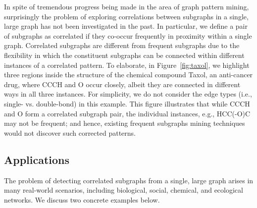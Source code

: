 In spite of tremendous progress being made in the area of graph pattern mining, surprisingly the problem of exploring correlations between subgraphs
in a single, large graph has not been investigated in the past. In particular, we define a pair of subgraphs as correlated if
they co-occur frequently in proximity within a single graph. Correlated subgraphs are different from frequent subgraphs due to
the flexibility in which the constituent subgraphs can be connected within different instances of a correlated pattern. To elaborate, in Figure~\ref{fig:taxol},
we highlight three regions inside the structure of the chemical compound {\sf Taxol}, an anti-cancer drug, where {\sf CCCH} and {\sf O} occur closely,
albeit they are connected in different ways in all three instances. For simplicity, we do not consider the edge types (i.e., single- vs. double-bond)
in this example. This figure illustrates that while {\sf CCCH} and {\sf O} form a correlated subgraph pair, the individual instances, e.g., {\sf HCC(-O)C}
may not be frequent; and hence, existing frequent subgraphs mining techniques would not discover such corrected patterns.

\vspace{-0.05in}
\subsection{Applications}
The problem of detecting correlated subgraphs from a single, large graph arises in many real-world scenarios, including biological,
social, chemical, and ecological networks. We discuss two concrete examples below.

